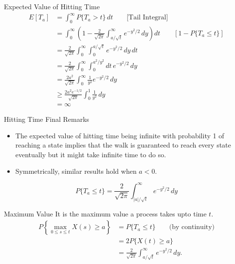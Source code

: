 \documentclass{beamer}
\begin{document}
    \begin{frame}{Expected Value of Hitting Time}
        \[
        \begin{aligned}
        E[T_a]
        &= \int_0^\infty P\{T_a > t\}\,dt \qquad \text{[Tail Integral]} \\[4pt]
        &= \int_0^\infty \left(1 - \frac{2}{\sqrt{2\pi}} \int_{a/\sqrt{t}}^\infty e^{-y^2/2}\,dy \right) dt \qquad [1-P\{T_a\le t\}] \\[4pt]
        &= \frac{2}{\sqrt{2\pi}} \int_0^\infty \int_0^{a/\sqrt{t}} e^{-y^2/2}\,dy\,dt \\[4pt]
        &= \frac{2}{\sqrt{2\pi}} \int_0^\infty \int_0^{a^2/y^2} dt\, e^{-y^2/2}\,dy \\[4pt]
        &= \frac{2a^2}{\sqrt{2\pi}} \int_0^\infty \frac{1}{y^2} e^{-y^2/2}\,dy \\[4pt]
        &\ge \frac{2a^2 e^{-1/2}}{\sqrt{2\pi}} \int_0^1 \frac{1}{y^2}\,dy \\[4pt]
        &= \infty
        \end{aligned}
        \]
    \end{frame}

    \begin{frame}{Hitting Time Final Remarks}
    \begin{itemize}
        \item The expected value of hitting time being infinite with probability 1 of reaching a state implies that the walk is guaranteed to reach every state eventually but it might take infinite time to do so.
        \item Symmetrically, similar results hold when $a<0$.
    \end{itemize}

    \begin{center}
        \[
        P\{T_a \le t\}
        =
        \frac{2}{\sqrt{2\pi}}
        \int_{|a|/\sqrt{t}}^\infty e^{-y^2/2}\,dy
        \]
    \end{center}
    
    \end{frame}

    \begin{frame}{Maximum Value}
        It is the maximum value a process takes upto time $t$.
        \[
        \begin{aligned}
        P\left\{ \max_{0 \le s \le t} X(s) \ge a \right\}
        &= P\{T_a \le t\}
        \qquad \text{(by continuity)} \\
        &= 2P\{X(t)\ge a\} \\
        &= \frac{2}{\sqrt{2\pi}} \int_{a/\sqrt{t}}^\infty e^{-y^2/2}\,dy.
        \end{aligned}
        \]
    \end{frame}
\end{document}
